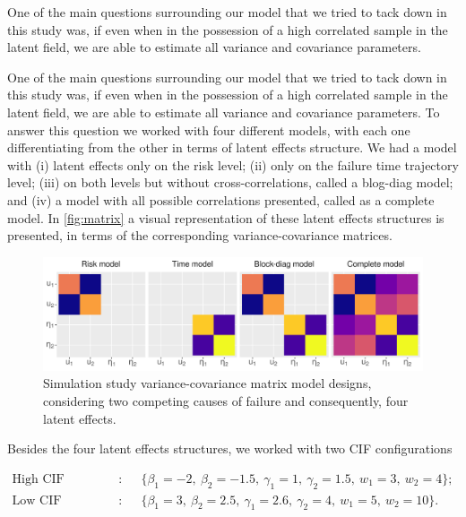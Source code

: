 \documentclass[a4paper,12pt]{article}
\begin{document}
One of the main questions surrounding our model that we tried to tack
down in this study was, if even when in the possession of a high
correlated sample in the latent field, we are able to estimate all
variance and covariance parameters.

One of the main questions surrounding our model that we tried to tack
down in this study was, if even when in the possession of a high
correlated sample in the latent field, we are able to estimate all
variance and covariance parameters. To answer this question we worked
with four different models, with each one differentiating from the other
in terms of latent effects structure. We had a model with (i) latent
effects only on the risk level; (ii) only on the failure time trajectory
level; (iii) on both levels but without cross-correlations, called a
blog-diag model; and (iv) a model with all possible correlations
presented, called as a complete model. In \autoref{fig:matrix} a visual
representation of these latent effects structures is presented, in terms
of the corresponding variance-covariance matrices.

\begin{figure}[H]
 \centering \includegraphics[width=\linewidth]{pics/matrix-1.png}
 \vspace{-0.75cm}
 \caption{Simulation study variance-covariance matrix model designs,
   considering two competing causes of failure and consequently, four
   latent effects.}
 \label{fig:matrix}
\end{figure}

Besides the four latent effects structures, we worked with two CIF
configurations

\begin{align*}
 \text{High CIF configuration}:~&\quad
 \{\beta_{1} = -2,~\beta_{2} = -1.5,~\gamma_{1} = 1,~\gamma_{2} = 1.5,~
   w_{1} = 3,~w_{2} = 4
 \};\\
 \text{Low CIF configuration}:~&\quad
 \{\beta_{1} = 3,~\beta_{2} = 2.5,~\gamma_{1} = 2.6,~\gamma_{2} = 4,~
   w_{1} = 5,~w_{2} = 10
 \}.
\end{align*}
\end{document}
